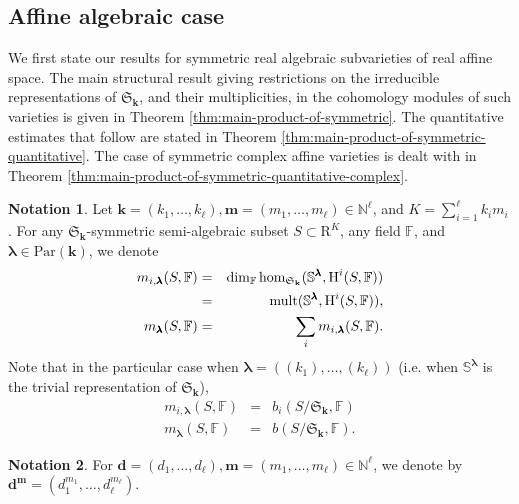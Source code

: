\documentclass{amsart}
\theoremstyle{definition}
\newtheorem{notation}{Notation}
\theoremstyle{remark}
\numberwithin{equation}{section}
\begin{document}
\subsection{Affine algebraic case}
We first state our results for symmetric real algebraic subvarieties of real affine space. The main structural
result giving restrictions on the irreducible representations of $\mathfrak{S}_{\mathbf{k}}$,
and their multiplicities,  in the cohomology modules of such varieties is given in Theorem
\ref{thm:main-product-of-symmetric}. The quantitative estimates that follow are stated in
Theorem \ref{thm:main-product-of-symmetric-quantitative}.
The case of symmetric complex affine varieties is dealt with in Theorem \ref{thm:main-product-of-symmetric-quantitative-complex}. 
\begin{notation}
  \label{not:multiplicity-betti} 
  Let ${\mathbf{k}} =(k_1,\ldots,k_\ell),{\mathbf{m}}=(m_1,\ldots,m_\ell) \in {\mathbb{N}}^\ell$, and 
  $K = \sum_{i=1}^\ell k_i m_i$.
  For any $\mathfrak{S}_{\mathbf{k}}$-symmetric
  semi-algebraic subset $S \subset {\mathrm{R}}^{K}$, any field ${\mathbb{F}}$, 
 and $\pmb{\lambda} \in {\mathrm{Par}}({\mathbf{k}})$, we denote
  \begin{eqnarray*}
    m_{i,\pmb{\lambda}} (S,{\mathbb{F}}) & =  & \dim_{\mathbb{F}} {\textrm{hom}}_{\mathfrak{S}_{\mathbf{k}}} (\mathbb{S}^{\pmb{\lambda}},{\mbox{\rm H}}^i(S,{\mathbb{F}}))\\
    &=& {\mathrm{mult}}(\mathbb{S}^{\pmb{\lambda}}, {\mbox{\rm H}}^i(S,{\mathbb{F}})), \\
    m_{\pmb{\lambda}} (S,{\mathbb{F}}) & =  & \sum_{i}  m_{i,\pmb{\lambda}} (S,{\mathbb{F}}).
  \end{eqnarray*}
  Note that in the particular case when $\pmb{\lambda} = ((k_1),\ldots,(k_\ell))$ (i.e. when $\mathbb{S}^{\pmb{\lambda}}$ is the trivial representation of $\mathfrak{S}_{\mathbf{k}}$), 
 \begin{eqnarray*}
    m_{i,\pmb{\lambda}} (S,{\mathbb{F}}) & =  &b_i(S/\mathfrak{S}_{\mathbf{k}},{\mathbb{F}})\\
    m_{\pmb{\lambda}} (S,{\mathbb{F}}) & =  & b(S/\mathfrak{S}_{\mathbf{k}},{\mathbb{F}}).
  \end{eqnarray*}
  
  
\end{notation}

\begin{notation}
For ${\mathbf{d}} = (d_1,\ldots,d_\ell),{\mathbf{m}} = (m_1,\ldots,m_\ell) \in {\mathbb{N}}^\ell$, we denote by 
${\mathbf{d}}^{\mathbf{m}} = (d_1^{m_1},\ldots,d_\ell^{m_\ell})$.
\end{notation}
\end{document}
